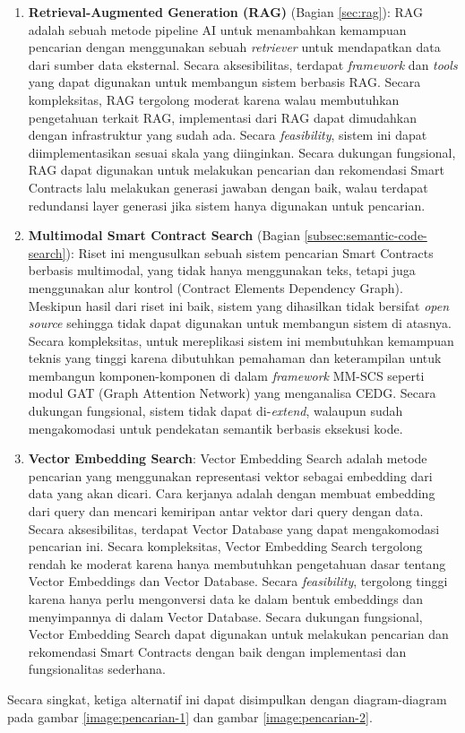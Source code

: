 \begin{enumerate}
    \item \textbf{Retrieval-Augmented Generation (RAG)} (Bagian \ref{sec:rag}): RAG adalah sebuah metode pipeline AI untuk menambahkan kemampuan pencarian dengan menggunakan sebuah \textit{retriever} untuk mendapatkan data dari sumber data eksternal. Secara aksesibilitas, terdapat \textit{framework} dan \textit{tools} yang dapat digunakan untuk membangun sistem berbasis RAG. Secara kompleksitas, RAG tergolong moderat karena walau membutuhkan pengetahuan terkait RAG, implementasi dari RAG dapat dimudahkan dengan infrastruktur yang sudah ada. Secara \textit{feasibility}, sistem ini dapat diimplementasikan sesuai skala yang diinginkan. Secara dukungan fungsional, RAG dapat digunakan untuk melakukan pencarian dan rekomendasi Smart Contracts lalu melakukan generasi jawaban dengan baik, walau terdapat redundansi layer generasi jika sistem hanya digunakan untuk pencarian.

    \item \textbf{Multimodal Smart Contract Search} \parencite{shi2021semantic} (Bagian \ref{subsec:semantic-code-search}): Riset ini mengusulkan sebuah sistem pencarian Smart Contracts berbasis multimodal, yang tidak hanya menggunakan teks, tetapi juga menggunakan alur kontrol (Contract Elements Dependency Graph). Meskipun hasil dari riset ini baik, sistem yang dihasilkan tidak bersifat \textit{open source} sehingga tidak dapat digunakan untuk membangun sistem di atasnya. Secara kompleksitas, untuk mereplikasi sistem ini membutuhkan kemampuan teknis yang tinggi karena dibutuhkan pemahaman dan keterampilan untuk membangun komponen-komponen di dalam \textit{framework} MM-SCS seperti modul GAT (Graph Attention Network) yang menganalisa CEDG. Secara dukungan fungsional, sistem tidak dapat di-\textit{extend}, walaupun sudah mengakomodasi untuk pendekatan semantik berbasis eksekusi kode.
    
    \item \textbf{Vector Embedding Search}: Vector Embedding Search adalah metode pencarian yang menggunakan representasi vektor sebagai embedding dari data yang akan dicari. Cara kerjanya adalah dengan membuat embedding dari query dan mencari kemiripan antar vektor dari query dengan data. Secara aksesibilitas, terdapat Vector Database yang dapat mengakomodasi pencarian ini. Secara kompleksitas, Vector Embedding Search tergolong rendah ke moderat karena hanya membutuhkan pengetahuan dasar tentang Vector Embeddings dan Vector Database. Secara \textit{feasibility}, tergolong tinggi karena hanya perlu mengonversi data ke dalam bentuk embeddings dan menyimpannya di dalam Vector Database. Secara dukungan fungsional, Vector Embedding Search dapat digunakan untuk melakukan pencarian dan rekomendasi Smart Contracts dengan baik dengan implementasi dan fungsionalitas sederhana.
\end{enumerate}

Secara singkat, ketiga alternatif ini dapat disimpulkan dengan diagram-diagram pada gambar \ref{image:pencarian-1} dan gambar \ref{image:pencarian-2}.